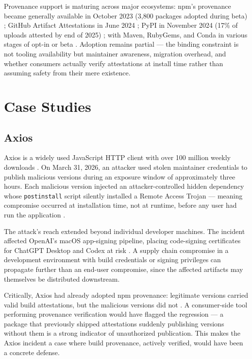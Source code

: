 \documentclass[12pt,a4paper]{article}
\begin{document}
Provenance support is maturing across major ecosystems: npm's provenance became generally available in October 2023 (3,800 packages adopted during beta) \cite{npm-provenance,sigstore-npm-ga}; GitHub Artifact Attestations in June 2024 \cite{github-attestations}; PyPI in November 2024 (17\% of uploads attested by end of 2025) \cite{pypi-attestations,pypi-2025}; with Maven, RubyGems, and Conda in various stages of opt-in or beta \cite{sonatype-sigstore,rubygems-updates,conda-sigstore}. Adoption remains partial --- the binding constraint is not tooling availability but maintainer awareness, migration overhead, and whether consumers actually verify attestations at install time rather than assuming safety from their mere existence.

\section{Case Studies}

\subsection{Axios}

Axios is a widely used JavaScript HTTP client with over 100 million weekly downloads \cite{axios-npm-stats}. On March 31, 2026, an attacker used stolen maintainer credentials to publish malicious versions during an exposure window of approximately three hours. Each malicious version injected an attacker-controlled hidden dependency whose \texttt{postinstall} script silently installed a Remote Access Trojan --- meaning compromise occurred at installation time, not at runtime, before any user had run the application \cite{axios-postmortem,microsoft-axios}.

The attack's reach extended beyond individual developer machines. The incident affected OpenAI's macOS app-signing pipeline, placing code-signing certificates for ChatGPT Desktop and Codex at risk \cite{openai-axios}. A supply chain compromise in a development environment with build credentials or signing privileges can propagate further than an end-user compromise, since the affected artifacts may themselves be distributed downstream.

Critically, Axios had already adopted npm provenance: legitimate versions carried valid build attestations, but the malicious versions did not \cite{axios-postmortem,microsoft-axios}. A consumer-side tool performing provenance verification would have flagged the regression --- a package that previously shipped attestations suddenly publishing versions without them is a strong indicator of unauthorized publication. This makes the Axios incident a case where build provenance, actively verified, would have been a concrete defense.
\end{document}
